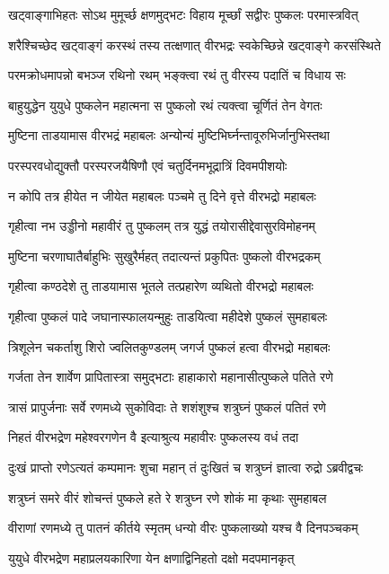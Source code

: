 \twolineshloka
{खट्वाङ्गाभिहतः सोऽथ मुमूर्च्छ क्षणमुद्भटः}
{विहाय मूर्च्छां सद्वीरः पुष्कलः परमास्त्रवित्}%

\twolineshloka
{शरैश्चिच्छेद खट्वाङ्गं करस्थं तस्य तत्क्षणात्}
{वीरभद्रः स्वकेच्छिन्ने खट्वाङ्गे करसंस्थिते}%

\twolineshloka
{परमक्रोधमापन्नो बभञ्ज रथिनो रथम्}
{भङ्क्त्वा रथं तु वीरस्य पदातिं च विधाय सः}%

\twolineshloka
{बाहुयुद्धेन युयुधे पुष्कलेन महात्मना}
{स पुष्कलो रथं त्यक्त्वा चूर्णितं तेन वेगतः}%

\twolineshloka
{मुष्टिना ताडयामास वीरभद्रं महाबलः}
{अन्योन्यं मुष्टिभिर्घ्नन्तावूरुभिर्जानुभिस्तथा}%

\twolineshloka
{परस्परवधोद्युक्तौ परस्परजयैषिणौ}
{एवं चतुर्दिनमभूद्रात्रिं दिवमपीशयोः}%

\twolineshloka
{न कोपि तत्र हीयेत न जीयेत महाबलः}
{पञ्चमे तु दिने वृत्ते वीरभद्रो महाबलः}%

\twolineshloka
{गृहीत्वा नभ उड्डीनो महावीरं तु पुष्कलम्}
{तत्र युद्धं तयोरासीद्देवासुरविमोहनम्}%

\twolineshloka
{मुष्टिना चरणाघातैर्बाहुभिः सुखुरैर्महत्}
{तदात्यन्तं प्रकुपितः पुष्कलो वीरभद्रकम्}%

\twolineshloka
{गृहीत्वा कण्ठदेशे तु ताडयामास भूतले}
{तत्प्रहारेण व्यथितो वीरभद्रो महाबलः}%

\twolineshloka
{गृहीत्वा पुष्कलं पादे जघानास्फालयन्मुहुः}
{ताडयित्वा महीदेशे पुष्कलं सुमहाबलः}%

\twolineshloka
{त्रिशूलेन चकर्ताशु शिरो ज्वलितकुण्डलम्}
{जगर्ज पुष्कलं हत्वा वीरभद्रो महाबलः}%

\twolineshloka
{गर्जता तेन शार्वेण प्रापितास्त्रा समुद्भटाः}
{हाहाकारो महानासीत्पुष्कले पतिते रणे}%

\twolineshloka
{त्रासं प्रापुर्जनाः सर्वे रणमध्ये सुकोविदाः}
{ते शशंशुश्च शत्रुघ्नं पुष्कलं पतितं रणे}%

\twolineshloka
{निहतं वीरभद्रेण महेश्वरगणेन वै}
{इत्याश्रुत्य महावीरः पुष्कलस्य वधं तदा}%

\twolineshloka
{दुःखं प्राप्तो रणेऽत्यतं कम्पमानः शुचा महान्}
{तं दुःखितं च शत्रुघ्नं ज्ञात्वा रुद्रो ऽब्रवीद्वचः}%

\twolineshloka
{शत्रुघ्नं समरे वीरं शोचन्तं पुष्कले हते}
{रे शत्रुघ्न रणे शोकं मा कृथाः सुमहाबल}%

\twolineshloka
{वीराणां रणमध्ये तु पातनं कीर्तये स्मृतम्}
{धन्यो वीरः पुष्कलाख्यो यश्च वै दिनपञ्चकम्}%

\twolineshloka
{युयुधे वीरभद्रेण महाप्रलयकारिणा}
{येन क्षणाद्विनिहतो दक्षो मदपमानकृत्}%

